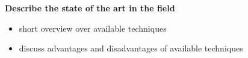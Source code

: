 
\noindent
\textbf{Describe the state of the art in the field}
\begin{itemize}
 \item short overview over available techniques
 \item discuss advantages and disadvantages of available techniques
\end{itemize}

